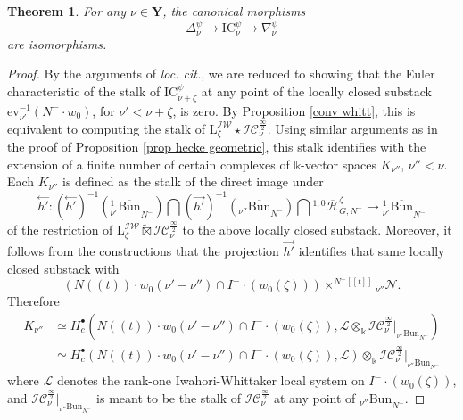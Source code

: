 \documentclass[11pt]{amsart}
\theoremstyle{plain}
\newtheorem{thm}{Theorem}[section]
\theoremstyle{remark}
\numberwithin{equation}{section}
\begin{document}
	\begin{thm}{{\cite[Theorem 4.4.10]{ABBGM}}}\label{prop clean IC}
		For any $\nu\in\mathbf{Y}$, the canonical morphisms
		$$\Delta_\nu^\psi\to \mathrm{IC}_\nu^\psi\to\nabla_\nu^\psi  $$
		are isomorphisms.
	\end{thm}
	\begin{proof}
		By the arguments of \textit{loc. cit.}, we are reduced to showing that the Euler characteristic of the stalk of $\mathrm{IC}_{\nu+\zeta}^\psi$ at any point of the locally closed substack $\mathrm{ev}_{\nu'}^{-1}(N^-\cdot w_0)$, for $\nu'<\nu+\zeta$, is zero. By Proposition \ref{conv whitt}, this is equivalent to computing the stalk of $\mathrm{L}^\mathcal{IW}_{\zeta}\star\mathcal{IC}^{\frac{\infty}{2}}_{\nu}$. Using similar arguments as in the proof of Proposition \ref{prop hecke geometric}, this stalk identifies with the extension of a finite number of certain complexes of $\mathbb{k}$-vector spaces $K_{\nu''}$, $\nu''<\nu$. Each $K_{\nu''}$ is defined as the stalk of the direct image under
		$$\overset{\leftarrow}{h'}:(\overset{\leftarrow}{h'})^{-1}({^1_{\nu'}\overline{\mathrm{Bun}}}_{N^-})\bigcap (\overset{\rightarrow}{h'})^{-1}({_{ \nu''}\overline{\mathrm{Bun}}}_{N^-})\bigcap {^{1,0}\overline{\mathcal{H}}^{\zeta}_{G,N^-}}\to {^1_{\nu'}\overline{\mathrm{Bun}}}_{N^-}$$
		of the restriction of $\mathrm{L}^\mathcal{IW}_{\zeta}\widetilde{\boxtimes}\mathcal{IC}^{\frac{\infty}{2}}_{\nu}$ to the above locally closed substack. Moreover, it follows from the constructions that the projection $\overset{\rightarrow}{h'}$ identifies that same locally closed substack with 
		$$\left(N((t))\cdot w_0(\nu'-\nu'')\cap I^-\cdot(w_0(\zeta))\right)\times^{N^-[[t]]}{_{\nu''}{\mathcal{N}}}.$$ 
		Therefore 
		\begin{align*}
		    K_{\nu''}&\simeq H^\bullet_c(N((t))\cdot w_0(\nu'-\nu'')\cap I^-\cdot(w_0(\zeta)),\mathcal{L}\otimes_\mathbb{k} \mathcal{IC}^{\frac{\infty}{2}}_{\nu}|_{{_{ \nu''}\mathrm{Bun}}_{N^-}})\\
      &\simeq H^\bullet_c(N((t))\cdot w_0(\nu'-\nu'')\cap I^-\cdot(w_0(\zeta)),\mathcal{L})\otimes_\mathbb{k} \mathcal{IC}^{\frac{\infty}{2}}_{\nu}|_{{_{ \nu''}\mathrm{Bun}}_{N^-}}
		\end{align*}
		where $\mathcal{L}$ denotes the rank-one Iwahori-Whittaker local system on $I^-\cdot( w_0(\zeta))$, and $\mathcal{IC}^{\frac{\infty}{2}}_{\nu}|_{{_{ \nu''}\mathrm{Bun}}_{N^-}}$ is meant to be the stalk of $\mathcal{IC}^{\frac{\infty}{2}}_{\nu}$ at any point of ${_{ \nu''}\mathrm{Bun}}_{N^-}$. 


\end{proof}
\end{document}
